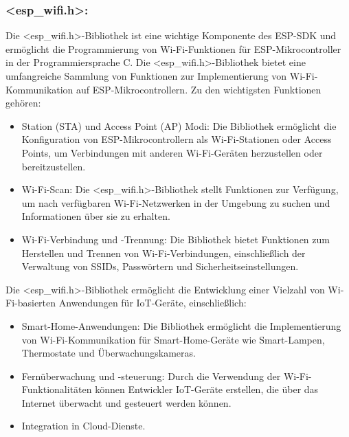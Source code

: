 \newpage
\subsubsection*{<esp\_wifi.h>:}

Die <esp\_wifi.h>-Bibliothek ist eine wichtige Komponente des ESP-SDK und ermöglicht die Programmierung von Wi-Fi-Funktionen für ESP-Mikrocontroller in der 
\newline Programmiersprache C. Die <esp\_wifi.h>-Bibliothek 
bietet eine umfangreiche Sammlung von Funktionen zur Implementierung von Wi-Fi-Kommunikation auf ESP-Mikrocontrollern. 
Zu den wichtigsten Funktionen gehören:

\begin{itemize}
    \item Station (STA) und Access Point (AP) Modi: Die Bibliothek ermöglicht die Konfiguration von ESP-Mikrocontrollern als Wi-Fi-Stationen oder Access Points, um Verbindungen mit anderen Wi-Fi-Geräten herzustellen oder bereitzustellen.
    \item Wi-Fi-Scan: Die <esp\_wifi.h>-Bibliothek stellt Funktionen zur Verfügung, um nach verfügbaren Wi-Fi-Netzwerken in der Umgebung zu suchen und Informationen über sie zu erhalten.
    \item Wi-Fi-Verbindung und -Trennung: Die Bibliothek bietet Funktionen zum Herstellen und Trennen von Wi-Fi-Verbindungen, einschließlich der Verwaltung von SSIDs, Passwörtern und Sicherheitseinstellungen.
\end{itemize}

Die <esp\_wifi.h>-Bibliothek ermöglicht die Entwicklung einer Vielzahl von Wi-Fi-basierten Anwendungen für IoT-Geräte, einschließlich:

\begin{itemize}
    \item Smart-Home-Anwendungen: Die Bibliothek ermöglicht die Implementierung von Wi-Fi-Kommunikation für Smart-Home-Geräte wie Smart-Lampen, Thermostate und Überwachungskameras.
    \item Fernüberwachung und -steuerung: Durch die Verwendung der Wi-Fi-Funktionalitäten können Entwickler IoT-Geräte erstellen, die über das Internet überwacht und gesteuert werden können.
    \item Integration in Cloud-Dienste.
\end{itemize}

\newpage
